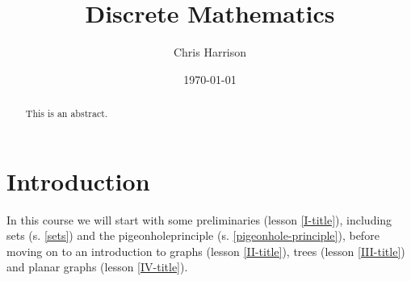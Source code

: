 \documentclass[11pt,a4paper]{article}
\title{Discrete Mathematics}
\author{Chris Harrison}
\date{\today}
\begin{document}
\maketitle 

\begin{abstract}
This is an abstract. 
\end{abstract}

\section*{Introduction}

In this course we will start with some preliminaries (lesson \ref{I-title}), including sets (s. \ref{sets}) and the pigeonholeprinciple (s. \ref{pigeonhole-principle}), before moving on to an introduction to graphs (lesson \ref{II-title}), trees (lesson \ref{III-title}) and planar graphs (lesson \ref{IV-title}).







\end{document}
